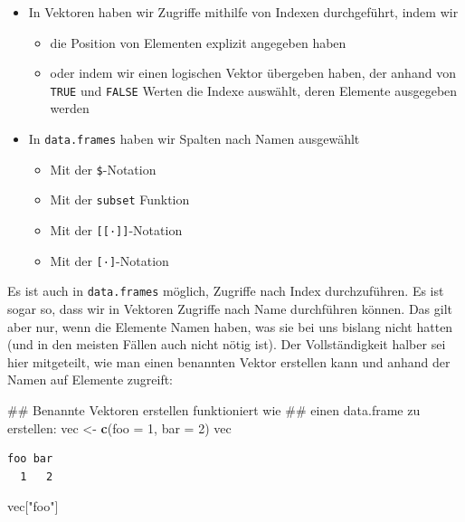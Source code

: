 \documentclass[12pt,]{tufte-book}
\newenvironment{Shaded}{\begin{snugshade}}{\end{snugshade}}
\newcommand{\KeywordTok}[1]{\textcolor[rgb]{0.13,0.29,0.53}{\textbf{#1}}}
\newcommand{\DataTypeTok}[1]{\textcolor[rgb]{0.13,0.29,0.53}{#1}}
\newcommand{\DecValTok}[1]{\textcolor[rgb]{0.00,0.00,0.81}{#1}}
\newcommand{\StringTok}[1]{\textcolor[rgb]{0.31,0.60,0.02}{#1}}
\newcommand{\NormalTok}[1]{#1}
\providecommand{\tightlist}{%
  \setlength{\itemsep}{0pt}\setlength{\parskip}{0pt}}
\theoremstyle{definition}
\theoremstyle{definition}
\theoremstyle{definition}
\theoremstyle{remark}
\begin{document}
\begin{itemize}
\tightlist
\item
  In Vektoren haben wir Zugriffe mithilfe von Indexen durchgeführt,
  indem wir

  \begin{itemize}
  \tightlist
  \item
    die Position von Elementen explizit angegeben haben
  \item
    oder indem wir einen logischen Vektor übergeben haben, der anhand
    von \texttt{TRUE} und \texttt{FALSE} Werten die Indexe auswählt,
    deren Elemente ausgegeben werden
  \end{itemize}
\item
  In \texttt{data.frames} haben wir Spalten nach Namen ausgewählt

  \begin{itemize}
  \tightlist
  \item
    Mit der \texttt{\$}-Notation
  \item
    Mit der \texttt{subset} Funktion
  \item
    Mit der \texttt{{[}{[}·{]}{]}}-Notation
  \item
    Mit der \texttt{{[}·{]}}-Notation
  \end{itemize}
\end{itemize}

Es ist auch in \texttt{data.frames} möglich, Zugriffe nach Index
durchzuführen. Es ist sogar so, dass wir in Vektoren Zugriffe nach Name
durchführen können. Das gilt aber nur, wenn die Elemente Namen haben,
was sie bei uns bislang nicht hatten (und in den meisten Fällen auch
nicht nötig ist). Der Vollständigkeit halber sei hier mitgeteilt, wie
man einen benannten Vektor erstellen kann und anhand der Namen auf
Elemente zugreift:

\begin{Shaded}
\begin{Highlighting}[]
\NormalTok{## Benannte Vektoren erstellen funktioniert wie}
\NormalTok{## einen data.frame zu erstellen:}
\NormalTok{vec <-}\StringTok{ }\KeywordTok{c}\NormalTok{(}\DataTypeTok{foo =} \DecValTok{1}\NormalTok{, }\DataTypeTok{bar =} \DecValTok{2}\NormalTok{)}
\NormalTok{vec}
\end{Highlighting}
\end{Shaded}

\begin{verbatim}
foo bar 
  1   2 
\end{verbatim}

\begin{Shaded}
\begin{Highlighting}[]
\NormalTok{vec[}\StringTok{"foo"}\NormalTok{]}
\end{Highlighting}
\end{Shaded}
\end{document}
